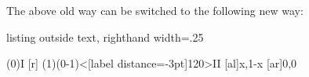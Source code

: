 The above old way can be switched to the following new way:

\begin{tcblisting}{listing outside text, righthand width=.25\linewidth}
\begin{istgame}[scale=1.2]
\istrootcntm(0){I}
  [r]  \istbm  \endist
\xtdistance{10mm}{20mm}
\istroot(1)(0-1)<[label distance=-3pt]120>{II}
  [al]{x,1-x}  [ar]{0,0}  \endist
\end{istgame}
\end{tcblisting}



